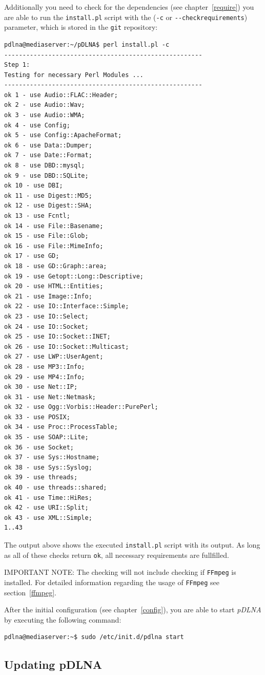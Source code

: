 \documentclass[a4paper,oneside,10pt]{report}
\newenvironment{colframeimportantnote}{%
  \begin{Sbox}
    \begin{minipage}{.99\columnwidth}
}{%
  \end{minipage}
  \end{Sbox}
  \begin{center}
    \fcolorbox{black}{Orange}{\TheSbox}
  \end{center}
}
\begin{document}
Additionally you need to check for the dependencies (see chapter~\ref{require}) you are able to run the \verb|install.pl| script with the (\verb|-c| or \verb|--checkrequirements|) parameter, which is stored in the \verb|git| repository:
\begin{lstlisting}
pdlna@mediaserver:~/pDLNA$ perl install.pl -c
------------------------------------------------------
Step 1:
Testing for necessary Perl Modules ...
------------------------------------------------------
ok 1 - use Audio::FLAC::Header;
ok 2 - use Audio::Wav;
ok 3 - use Audio::WMA;
ok 4 - use Config;
ok 5 - use Config::ApacheFormat;
ok 6 - use Data::Dumper;
ok 7 - use Date::Format;
ok 8 - use DBD::mysql;
ok 9 - use DBD::SQLite;
ok 10 - use DBI;
ok 11 - use Digest::MD5;
ok 12 - use Digest::SHA;
ok 13 - use Fcntl;
ok 14 - use File::Basename;
ok 15 - use File::Glob;
ok 16 - use File::MimeInfo;
ok 17 - use GD;
ok 18 - use GD::Graph::area;
ok 19 - use Getopt::Long::Descriptive;
ok 20 - use HTML::Entities;
ok 21 - use Image::Info;
ok 22 - use IO::Interface::Simple;
ok 23 - use IO::Select;
ok 24 - use IO::Socket;
ok 25 - use IO::Socket::INET;
ok 26 - use IO::Socket::Multicast;
ok 27 - use LWP::UserAgent;
ok 28 - use MP3::Info;
ok 29 - use MP4::Info;
ok 30 - use Net::IP;
ok 31 - use Net::Netmask;
ok 32 - use Ogg::Vorbis::Header::PurePerl;
ok 33 - use POSIX;
ok 34 - use Proc::ProcessTable;
ok 35 - use SOAP::Lite;
ok 36 - use Socket;
ok 37 - use Sys::Hostname;
ok 38 - use Sys::Syslog;
ok 39 - use threads;
ok 40 - use threads::shared;
ok 41 - use Time::HiRes;
ok 42 - use URI::Split;
ok 43 - use XML::Simple;
1..43
\end{lstlisting}
The output above shows the executed \verb|install.pl| script with its output. As long as all of these checks return \verb|ok|, all necessary requirements are fullfilled.

\begin{colframeimportantnote}
\textsc{IMPORTANT NOTE:} The checking will not include checking if \verb|FFmpeg| is installed. For detailed information regarding the usage of \verb|FFmpeg| see section~\ref{ffmpeg}.
\end{colframeimportantnote}

After the initial configuration (see chapter~\ref{config}), you are able to start {\em pDLNA} by executing the following command:
\begin{lstlisting}
pdlna@mediaserver:~$ sudo /etc/init.d/pdlna start
\end{lstlisting}

\subsection{Updating pDLNA}
\label{install-unix-git-update}
\end{document}
